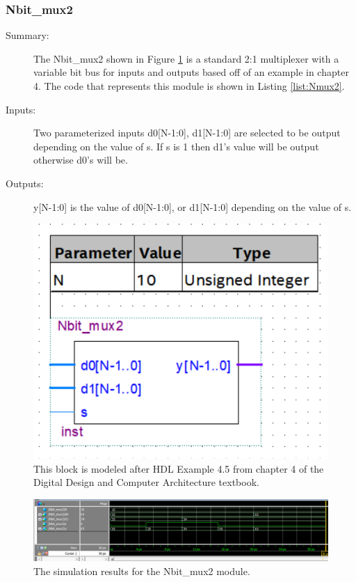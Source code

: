 \documentclass[a4paper]{article}
\begin{document}
\subsubsection{Nbit\_mux2}
\begin{description}
    \item[Summary: ] The Nbit\_mux2 shown in Figure \ref{fig:mux2} is a standard 2:1 multiplexer with a variable bit bus for inputs and outputs based off of an example in chapter 4. The code that represents this module is shown in Listing \ref{list:Nmux2}.
    
    \item[Inputs: ] Two parameterized inputs d0[N-1:0], d1[N-1:0] are selected to be output depending on the value of s. If s is 1 then d1's value will be output otherwise d0's will be. 
    
    \item[Outputs: ] y[N-1:0] is the value of d0[N-1:0], or d1[N-1:0] depending on the value of s.
\end{description}

\begin{figure}[H]
    \centering
    \includegraphics[width=.5\textwidth]{Images/Nbit_mux2.png}
    \caption{This block is modeled after HDL Example 4.5 from chapter 4 of the Digital Design and Computer Architecture textbook.}
    \label{fig:mux2}
\end{figure}

\begin{figure}[H]
    \centering
    \includegraphics[width=5.91in]{Images/NbitmuxSim.png}
    \caption{The simulation results for the Nbit\_mux2 module.}
    \label{fig:mux_sim}
\end{figure}
\end{document}
